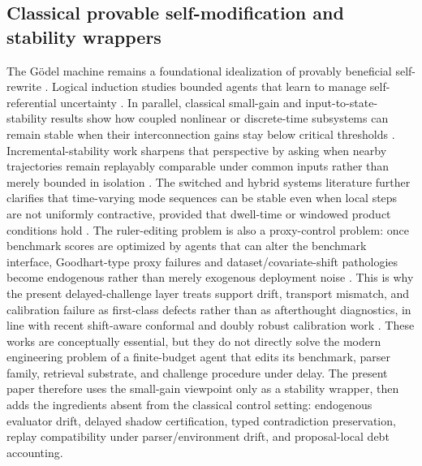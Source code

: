 \documentclass[11pt]{article}
\theoremstyle{definition}
\newcommand{\1}{\mathbf{1}}
\begin{document}
\subsection{Classical provable self-modification and stability wrappers}
The G\"odel machine remains a foundational idealization of provably beneficial self-rewrite \cite{Schmidhuber2007}. Logical induction studies bounded agents that learn to manage self-referential uncertainty \cite{Garrabrant2016}. In parallel, classical small-gain and input-to-state-stability results show how coupled nonlinear or discrete-time subsystems can remain stable when their interconnection gains stay below critical thresholds \cite{JiangTeelPraly1994,JiangWang2001}. Incremental-stability work sharpens that perspective by asking when nearby trajectories remain replayably comparable under common inputs rather than merely bounded in isolation \cite{Angeli2002,Angeli2009}. The switched and hybrid systems literature further clarifies that time-varying mode sequences can be stable even when local steps are not uniformly contractive, provided that dwell-time or windowed product conditions hold \cite{LiberzonMorse1999,HespanhaMorse1999ADT,ShortenWirth2007,LinAntsaklis2009}. The ruler-editing problem is also a proxy-control problem: once benchmark scores are optimized by agents that can alter the benchmark interface, Goodhart-type proxy failures and dataset/covariate-shift pathologies become endogenous rather than merely exogenous deployment noise \cite{ManheimGarrabrant2018,DatasetShift2008}. This is why the present delayed-challenge layer treats support drift, transport mismatch, and calibration failure as first-class defects rather than as afterthought diagnostics, in line with recent shift-aware conformal and doubly robust calibration work \cite{Tibshirani2019,Yang2024,Jonkers2024,JinCandes2026}. These works are conceptually essential, but they do not directly solve the modern engineering problem of a finite-budget agent that edits its benchmark, parser family, retrieval substrate, and challenge procedure under delay. The present paper therefore uses the small-gain viewpoint only as a stability wrapper, then adds the ingredients absent from the classical control setting: endogenous evaluator drift, delayed shadow certification, typed contradiction preservation, replay compatibility under parser/environment drift, and proposal-local debt accounting.
\end{document}
